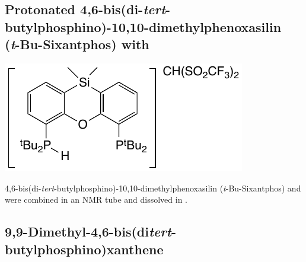 \subsection*{Protonated 4,6-bis(di-\emph{tert}-butylphosphino)-10,10-dimethylphenoxasilin\\(\emph{t}-Bu-Sixantphos) with }

\begin{structure}[h]
\begin{center}
\includegraphics{../Structures/SitBuH.pdf}
\end{center}
\end{structure}

4,6-bis(di-\emph{tert}-butylphosphino)-10,10-dimethylphenoxasilin (\emph{t}-Bu-Sixantphos) and  were combined in an NMR tube and dissolved in .  




\subsection*{9,9-Dimethyl-4,6-bis(di\emph{tert}-butylphosphino)xanthene}

